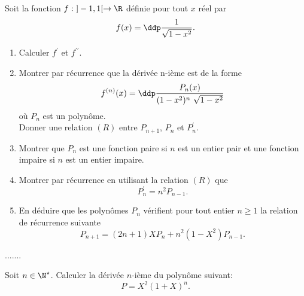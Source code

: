 \documentclass[a4paper, 11pt,reqno]{article}
\begin{document}
\begin{exercice}
	Soit la fonction $f:\ \rbrack -1,1\lbrack\rightarrow\R$ d\'efinie pour tout $x$ r\'eel par
	$$f(x)=\ddp\frac{1}{\sqrt{1-x^2}}.$$
	\begin{enumerate}
		\item Calculer $f^{\prime}$ et $f^{\prime\prime}$.
		\item Montrer par r\'ecurrence que la d\'eriv\'ee n-i\`eme est de la forme
		      $$f^{(n)}(x)=\ddp\frac{P_n(x)}{(1-x^2)^n\ \sqrt{1-x^2}}$$
		      o\`u $P_n$ est un polyn\^ome.\\
		      \noindent Donner une relation $(R)$ entre $P_{n+1}$, $P_n$ et $P_n^{\prime}$.
		\item Montrer que $P_n$ est une fonction paire si $n$ est un entier pair et une fonction impaire si $n$ est un entier impaire.
		\item Montrer par r\'ecurrence en utilisant la relation $(R)$ que
		      $$P_n^{\prime}=n^2P_{n-1}.$$
		\item En d\'eduire que les polyn\^omes $P_n$ v\'erifient pour tout entier $n\geq 1$ la relation de r\'ecurrence suivante
		      $$P_{n+1}=(2n+1)XP_n+n^2(1-X^2)P_{n-1}.$$
	\end{enumerate}
\end{exercice}

\begin{correction}
	.......
\end{correction}




%
\begin{exercice}
	Soit $n\in\N^{\star}$. Calculer la d\'eriv\'ee $n$-i\`eme du polyn\^ome suivant:
	$$P=X^2(1+X)^n.$$
\end{exercice}
\end{document}
